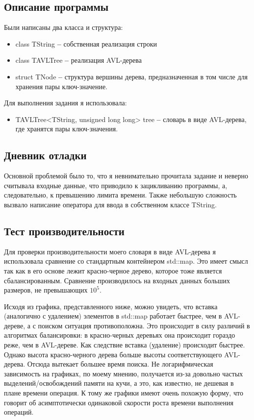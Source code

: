 \documentclass[12pt]{article}
\begin{document}
\subsection*{Описание программы}
Были написаны два класса и структура:
\begin{itemize}
\item class TString \textbf{--} собственная реализация строки
\item class TAVLTree \textbf{--} реализация AVL-дерева
\item struct TNode \textbf{--} структура вершины дерева, предназначенная в том числе для хранения пары ключ-значение.
\end{itemize}

Для выполнения задания я использовала:
\begin{itemize}
\item TAVLTree<TString, unsigned long long> tree \textbf{--} словарь в виде AVL-дерева, где хранятся пары ключ-значения. 
\end{itemize}

\subsection*{Дневник отладки}

Основной проблемой было то, что я невнимательно прочитала задание и неверно считывала входные данные, что приводило к зацикливанию программы, а, следовательно, к превышению лимита времени.
Также небольшую сложность вызвало написание оператора для ввода в собственном классе TString.

\subsection*{Тест производительности}

Для проверки производительности моего словаря в виде AVL-дерева я использовала сравнение со стандартным контейнером std::map. Это имеет смысл так как в его основе лежит красно-черное дерево, которое тоже является сбалансированным.
Сравнение производилось на входных данных больших размеров, не превышающих ${10^5}$. 

Исходя из графика, представленного ниже, можно увидеть, что вставка (аналогично с удалением) элементов в std::map работает быстрее, чем в AVL-дереве, а с поиском ситуация противоположна. Это происходит в силу различий в алгоритмах балансировки: в красно-черных деревьях она происходит гораздо реже, чем в AVL-дереве. Как следствие вставка (удаление) происходит быстрее. Однако высота красно-черного дерева больше высоты соответствующего AVL-дерева. Отсюда вытекает большее время поиска.
Не логарифмическая зависимость на графиках, по моему мнению, получается из-за довольно частых выделений/освобождений памяти на кучи, а это, как известно, не дешевая в плане времени операция. К тому же графики имеют очень похожую форму, что говорит об асимптотически одинаковой скорости роста времени выполнения операций.
\end{document}
